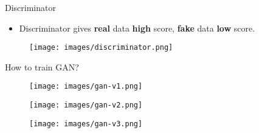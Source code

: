 \documentclass[handout]{beamer}
\begin{document}
\begin{frame}[<+->]{Discriminator}
	\begin{itemize}
		\item Discriminator gives \textbf{real} data \textbf{high} score, \textbf{fake} data \textbf{low} score.
	\end{itemize}
	\begin{actionenv}
		\begin{figure}
			\centering
			\texttt{[image: images/discriminator.png]}
		\end{figure}
	\end{actionenv}
\end{frame}

\begin{frame}[<+->]{How to train GAN?}
	\begin{actionenv}
		\begin{figure}
			\centering
			\texttt{[image: images/gan-v1.png]}
		\end{figure}
	\end{actionenv}
	\begin{actionenv}
		\begin{figure}
			\centering
			\texttt{[image: images/gan-v2.png]}
		\end{figure}
	\end{actionenv}
	\begin{actionenv}
		\begin{figure}
			\centering
			\texttt{[image: images/gan-v3.png]}
		\end{figure}
	\end{actionenv}
\end{frame}
\end{document}
